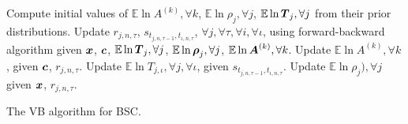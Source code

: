 \begin{algorithm}
\DontPrintSemicolon
 \nl Compute initial values of $\mathbb{E}\ln A^{(k)},\forall k$,
 $\mathbb{E}\ln \rho_j,\forall j$, 
 $\mathbb{E}\ln \boldsymbol T_j,\forall j$ 
 from their prior distributions.\;
 {
 \nl Update $r_{j,n,\tau}$, $s_{t_{j,n,\tau\!-\!1}, t_{\iota,n,\tau}}$, $\forall j,\forall \tau,\forall i,\forall \iota$,
 using forward-backward algorithm
 given $\boldsymbol x$, $\boldsymbol c$, $\mathbb{E}\ln \boldsymbol T_j,\forall j$,
 $\mathbb{E}\ln\boldsymbol\rho_j,\forall j$, 
  $\mathbb{E}\ln\boldsymbol A^{(k)},\forall k$.\;%
 \nl Update $\mathbb{E}\ln A^{(k)},\forall k$, 
 given $\boldsymbol c$, $r_{j,n,\tau}$.\;
 \nl Update $\mathbb{E}\ln T_{j,\iota},\forall j,\forall \iota$, 
 given $s_{t_{j,n,\tau\!-\!1}, t_{\iota,n,\tau}}$.\;
 \nl Update $\mathbb{E}\ln \rho_j),\forall j$ given $\boldsymbol x$, $r_{j,n,\tau}$.
 }
\;
\caption{The VB algorithm for BSC.}
\label{al:vb_bac}
\end{algorithm}

